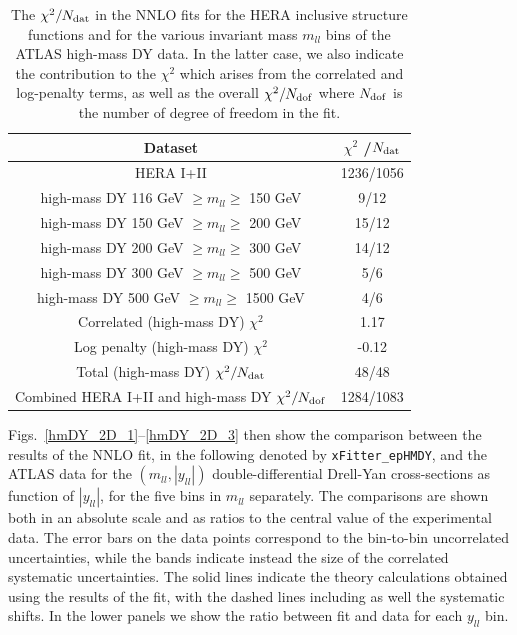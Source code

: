 \begin{table}[t]
  \centering
  \begin{tabular}{|c|c|}
    \hline
    Dataset  &   $\chi^2$ /$N_{\rm dat}$ \\
    \hline
    \hline
    HERA I+II & 1236/1056\\
    \hline
    high-mass DY  116 GeV $\ge m_{ll} \ge $ 150 GeV  &  9/12 \\
    high-mass DY  150 GeV $\ge m_{ll} \ge $ 200 GeV  &  15/12 \\
    high-mass DY  200 GeV $\ge m_{ll} \ge $ 300 GeV  &  14/12 \\
    high-mass DY  300 GeV $\ge m_{ll} \ge $ 500 GeV  &  5/6 \\
    high-mass DY  500 GeV $\ge m_{ll} \ge $ 1500 GeV &  4/6 \\
    \hline
    Correlated (high-mass DY) $\chi^2$ & 1.17 \\
    Log penalty (high-mass DY) $\chi^2$  & -0.12 \\
    \hline
    Total  (high-mass DY) $\chi^2/N_{\rm dat}$  & 48/48 \\
    \hline
    \hline
    Combined HERA I+II and high-mass DY $\chi^2/N_{\rm dof}$   & 1284/1083 \\
    \hline
    \end{tabular}
  \caption{The $\chi^{2}/N_{\rm dat}$ in the NNLO fits for the
    HERA inclusive structure functions and for the various
    invariant mass $m_{ll}$ bins of the ATLAS high-mass DY data.
    In the latter case, we also indicate the contribution to the
    $\chi^2$ which arises from the correlated and log-penalty terms,
    as well as the overall $\chi^2/N_{\rm dof}$ where $N_{\rm dof}$ is
    the number of degree of freedom in the fit.
\label{tab:chi2fit}
  }
\end{table}

Figs.~\ref{hmDY_2D_1}--\ref{hmDY_2D_3} then show the
comparison between the results of the NNLO fit, in the following
denoted by {\tt xFitter\_epHMDY},
and the ATLAS data
  for the $(m_{ll},|y_{ll}|)$ double-differential Drell-Yan cross-sections
  as function of $|y_{ll}|$, for the five bins in $m_{ll}$ separately.
  The comparisons are shown both
  in an absolute scale  and as ratios to the central value
  of the experimental data.
  The error bars on the data points correspond to the bin-to-bin uncorrelated
  uncertainties, while the bands
  indicate instead the size of the correlated systematic uncertainties.
  The solid lines indicate the theory calculations obtained using the results
  of the fit, with the dashed lines including as well the systematic shifts.
  In the lower panels we show the ratio between fit and data for each $y_{ll}$ bin.


